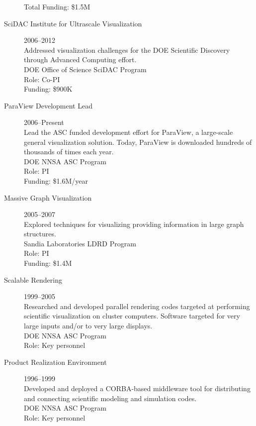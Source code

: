 \documentclass{article}
\begin{document}
\begin{description}
  Total Funding: \$1.5M
\item[SciDAC Institute for Ultrascale Visualization]\hfill 2006--2012\\
  Addressed visualization challenges for the DOE Scientific Discovery through Advanced Computing effort.\\
  DOE Office of Science SciDAC Program\\
  Role: Co-PI\\
  Funding: \$900K
\item[ParaView Development Lead]\hfill 2006--Present\\
  Lead the ASC funded development effort for ParaView, a large-scale
  general visualization solution. Today, ParaView is downloaded hundreds of thousands of times each year.\\
  DOE NNSA ASC Program\\
  Role: PI\\
  Funding: \$1.6M/year %
\item[Massive Graph Visualization]\hfill 2005--2007 \\
  Explored techniques for visualizing providing information in large
  graph structures.\\
  Sandia Laboratories LDRD Program\\
  Role: PI\\
  Funding: \$1.4M
\item[Scalable Rendering]\hfill 1999--2005 \\
  Researched and developed parallel rendering codes targeted at performing scientific visualization on cluster computers.  Software targeted for very large inputs and/or to very large displays.\\
  DOE NNSA ASC Program\\
  Role: Key personnel
\item[Product Realization Environment]\hfill 1996--1999 \\
  Developed and deployed a CORBA-based middleware tool for distributing
  and connecting scientific modeling and simulation codes.\\
  DOE NNSA ASC Program\\
  Role: Key personnel
\end{description}
\end{document}
